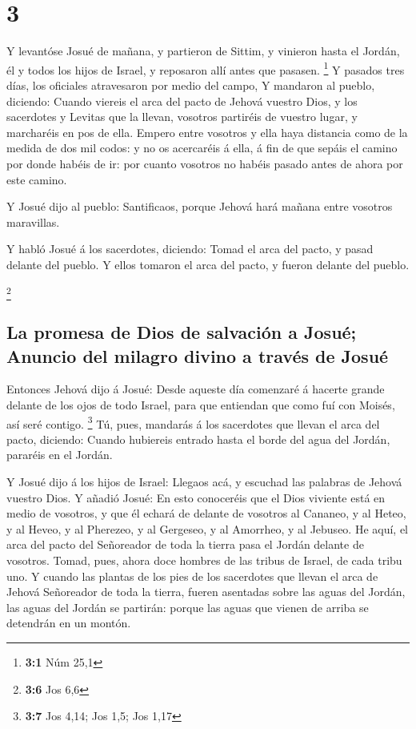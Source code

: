 \hypertarget{section-2}{%
\section{3}\label{section-2}}

 Y levantóse Josué de mañana, y partieron de Sittim, y
vinieron hasta el Jordán, él y todos los hijos de Israel, y reposaron
allí antes que pasasen. \footnote{\textbf{3:1} Núm 25,1} 
Y pasados tres días, los oficiales atravesaron por medio del campo,
 Y mandaron al pueblo, diciendo: Cuando viereis el arca
del pacto de Jehová vuestro Dios, y los sacerdotes y Levitas que la
llevan, vosotros partiréis de vuestro lugar, y marcharéis en pos de
ella.  Empero entre vosotros y ella haya distancia como de
la medida de dos mil codos: y no os acercaréis á ella, á fin de que
sepáis el camino por donde habéis de ir: por cuanto vosotros no habéis
pasado antes de ahora por este camino.

 Y Josué dijo al pueblo: Santificaos, porque Jehová hará
mañana entre vosotros maravillas.

 Y habló Josué á los sacerdotes, diciendo: Tomad el arca
del pacto, y pasad delante del pueblo. Y ellos tomaron el arca del
pacto, y fueron delante del pueblo.

\footnote{\textbf{3:6} Jos 6,6}

\hypertarget{la-promesa-de-dios-de-salvaciuxf3n-a-josuuxe9-anuncio-del-milagro-divino-a-travuxe9s-de-josuuxe9}{%
\subsection{La promesa de Dios de salvación a Josué; Anuncio del milagro
divino a través de
Josué}\label{la-promesa-de-dios-de-salvaciuxf3n-a-josuuxe9-anuncio-del-milagro-divino-a-travuxe9s-de-josuuxe9}}

 Entonces Jehová dijo á Josué: Desde aqueste día comenzaré
á hacerte grande delante de los ojos de todo Israel, para que entiendan
que como fuí con Moisés, así seré contigo. \footnote{\textbf{3:7} Jos
  4,14; Jos 1,5; Jos 1,17}  Tú, pues, mandarás á los
sacerdotes que llevan el arca del pacto, diciendo: Cuando hubiereis
entrado hasta el borde del agua del Jordán, pararéis en el Jordán.

 Y Josué dijo á los hijos de Israel: Llegaos acá, y
escuchad las palabras de Jehová vuestro Dios.  Y añadió
Josué: En esto conoceréis que el Dios viviente está en medio de
vosotros, y que él echará de delante de vosotros al Cananeo, y al Heteo,
y al Heveo, y al Pherezeo, y al Gergeseo, y al Amorrheo, y al Jebuseo.
 He aquí, el arca del pacto del Señoreador de toda la
tierra pasa el Jordán delante de vosotros.  Tomad, pues,
ahora doce hombres de las tribus de Israel, de cada tribu uno.
 Y cuando las plantas de los pies de los sacerdotes que
llevan el arca de Jehová Señoreador de toda la tierra, fueren asentadas
sobre las aguas del Jordán, las aguas del Jordán se partirán: porque las
aguas que vienen de arriba se detendrán en un montón.

